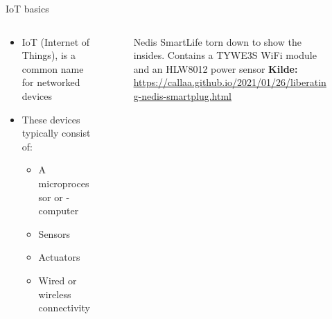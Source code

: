 \documentclass[aspectratio=169]{beamer}
\begin{document}
\begin{frame}{IoT basics}
\begin{columns}
	\begin{column}{0.6\textwidth}
		\begin{textBox}
			\begin{itemize}
				\item IoT (Internet of Things), is a common name for networked devices
				\item These devices typically consist of:
				\begin{itemize}
					\item A microprocessor or -computer
					\item Sensors
					\item Actuators
					\item Wired or wireless connectivity
				\end{itemize}
			\end{itemize}
		\end{textBox}
	\end{column}
	\begin{column}{0.4\textwidth}
		\centering
		\begin{figure}
			\captionsetup{format=tcbcaptionminmargin}
  			\caption{Nedis SmartLife torn down to show the insides. Contains a TYWE3S WiFi module and an HLW8012 power sensor
  			\captionline \textbf{Kilde:} \url{https://callaa.github.io/2021/01/26/liberating-nedis-smartplug.html}}
  			\label{fig:iot-device}
		\end{figure}
	\end{column}
\end{columns}
\end{frame}
\end{document}
